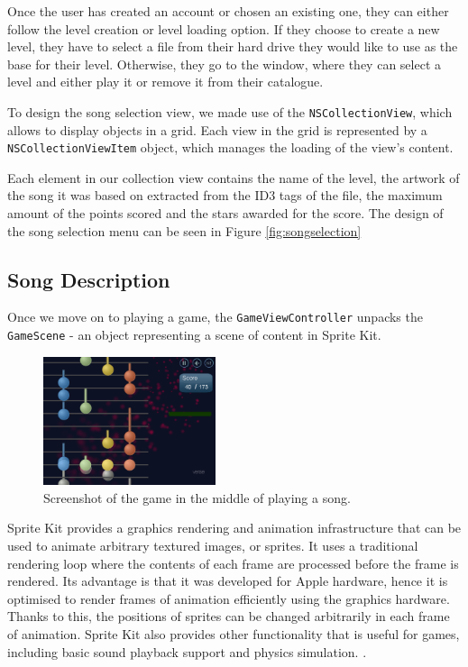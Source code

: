 Once the user has created an account or chosen an existing one, they can either follow the level creation or level loading option. If they choose to create a new level, they have to select a file from their hard drive they would like to use as the base for their level. Otherwise, they go to the window, where they can select a level and either play it or remove it from their catalogue.

To design the song selection view, we made use of the \verb|NSCollectionView|, which allows to display objects in a grid. Each view in the grid is represented by a \verb|NSCollectionViewItem| object, which manages the loading of the view's content.

Each element in our collection view contains the name of the level, the artwork of the song it was based on extracted from the ID3 tags of the file, the maximum amount of the points scored and the stars awarded for the score. The design of the song selection menu can be seen in Figure \ref{fig:songselection}

\vspace{10pt}

\subsection{Song Description}

Once we move on to playing a game, the \verb|GameViewController| unpacks the \verb|GameScene| - an object representing a scene of content in Sprite Kit.

\begin{figure}
  \begin{center}
    \includegraphics[width=0.45\textwidth]{Figures/FullGame}
  \end{center}
  \caption{Screenshot of the game in the middle of playing a song.}
\label{fig:overallgamescreen}
\end{figure}

Sprite Kit provides a graphics rendering and animation infrastructure that can be used to animate arbitrary textured images, or sprites. It uses a traditional rendering loop where the contents of each frame are processed before the frame is rendered. Its advantage is that it was developed for Apple hardware, hence it is optimised to render frames of animation efficiently using the graphics hardware. Thanks to this, the positions of sprites can be changed arbitrarily in each frame of animation. Sprite Kit also provides other functionality that is useful for games, including basic sound playback support and physics simulation. \cite{spritekit}. 

